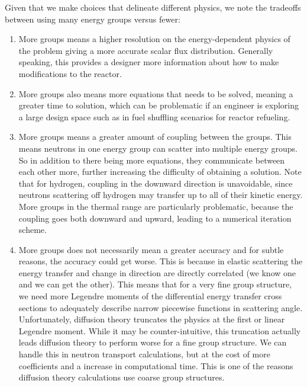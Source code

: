Given that we make choices that delineate different physics, we note the tradeoffs between using many energy groups versus fewer:
\begin{enumerate}
  \item More groups means a higher resolution on the energy-dependent physics of the problem giving a more accurate scalar flux distribution. Generally speaking, this provides a designer more information about how to make modifications to the reactor.
  \item More groups also means more equations that needs to be solved, meaning a greater time to solution, which can be problematic if an engineer is exploring a large design space such as in fuel shuffling scenarios for reactor refueling.
  \item More groups means a greater amount of coupling between the groups. This means neutrons in one energy group can scatter into multiple energy groups. So in addition to there being more equations, they communicate between each other more, further increasing the difficulty of obtaining a solution. Note that for hydrogen, coupling in the downward direction is unavoidable, since neutrons scattering off hydrogen may transfer up to all of their kinetic energy. More groups in the thermal range are particularly problematic, because the coupling goes both downward and upward, leading to a numerical iteration scheme.
  \item More groups does not necessarily mean a greater accuracy and for subtle reasons, the accuracy could get worse. This is because in elastic scattering the energy transfer and change in direction are directly correlated (we know one and we can get the other). This means that for a very fine group structure, we need more Legendre moments of the differential energy transfer cross sections to adequately describe narrow piecewise functions in scattering angle. Unfortunately, diffusion theory truncates the physics at the first or linear Legendre moment. While it may be counter-intuitive, this truncation actually leads diffusion theory to perform worse for a fine group structure. We can handle this in neutron transport calculations, but at the cost of more coefficients and a increase in computational time. This is one of the reasons diffusion theory calculations use coarse group structures.
\end{enumerate}

